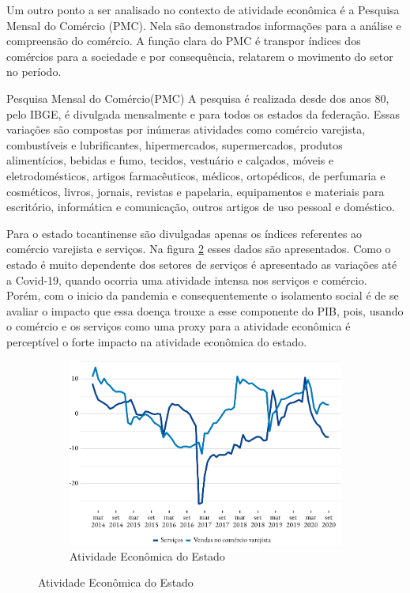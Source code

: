 \par Um outro ponto a ser analisado no contexto de atividade econômica é a Pesquisa Mensal do Comércio (PMC). Nela são demonstrados informações para a análise e compreensão do comércio. A função clara do PMC é transpor índices dos comércios para a sociedade e por consequência, relatarem o movimento do setor no período. 

\begin{smbox}[label={labelbox},nameref={Pesquisa Mensal do Comércio(PMC)}]{Pesquisa Mensal do Comércio(PMC)}
	A pesquisa é realizada desde dos anos 80, pelo IBGE, é divulgada mensalmente e para todos os estados da federação. Essas variações são compostas por inúmeras atividades como comércio varejista, combustíveis e lubrificantes, hipermercados, supermercados, produtos alimentícios, bebidas e fumo, tecidos, vestuário e calçados, móveis e eletrodomésticos, artigos farmacêuticos, médicos, ortopédicos, de perfumaria e cosméticos, livros, jornais, revistas e papelaria, equipamentos e materiais para escritório, informática e comunicação, outros artigos de uso pessoal e doméstico.
\end{smbox}

\par Para o estado tocantinense são divulgadas apenas os índices referentes ao comércio varejista e serviços. Na figura \ref{fig:pmc} esses dados são apresentados. Como o estado é muito dependente dos setores de serviços é apresentado as variações até a Covid-19, quando ocorria uma atividade intensa nos serviços e comércio. Porém, com o inicio da pandemia e consequentemente o isolamento social é de se avaliar o impacto que essa doença trouxe a esse componente do PIB, pois, usando o comércio e os serviços como uma proxy para a atividade econômica é perceptível o forte impacto na atividade econômica do estado. 

\begin{figure}[!h]
	\begin{subfigure}{\linewidth}
		\caption{Atividade Econômica do Estado}
		\label{fig:pmc}
		\includegraphics{fig/pmc_ibge-1.pdf}
	\end{subfigure}
\end{figure}

